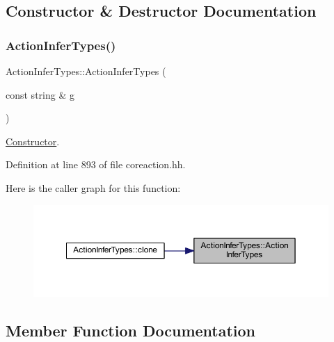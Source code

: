 \subsection{Constructor \& Destructor Documentation}
\mbox{\label{class_action_infer_types_a0c48c0551fda1e65454138e573f0cb41}} 
\subsubsection{\texorpdfstring{ActionInferTypes()}{ActionInferTypes()}}
{\footnotesize\ttfamily Action\+Infer\+Types\+::\+Action\+Infer\+Types (\begin{DoxyParamCaption}\item[{const string \&}]{g }\end{DoxyParamCaption})\hspace{0.3cm}{\ttfamily [inline]}}



\mbox{\hyperlink{class_constructor}{Constructor}}. 



Definition at line 893 of file coreaction.\+hh.

Here is the caller graph for this function\+:
\nopagebreak
\begin{figure}[H]
\begin{center}
\leavevmode
\includegraphics[width=350pt]{class_action_infer_types_a0c48c0551fda1e65454138e573f0cb41_icgraph}
\end{center}
\end{figure}


\subsection{Member Function Documentation}
\mbox{\label{class_action_infer_types_a0f50c538353ecf22ba3651d8e1a661ed}} 

